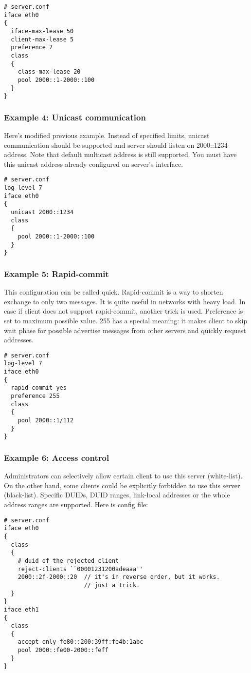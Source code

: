 \begin{lstlisting}
# server.conf
iface eth0
{
  iface-max-lease 50
  client-max-lease 5
  preference 7
  class
  {
    class-max-lease 20
    pool 2000::1-2000::100
  }
}  
\end{lstlisting}

\subsubsection{Example 4: Unicast communication}
Here's modified previous example. Instead of specified limits, unicast
communication should be supported and server should listen on
2000::1234 address. Note that default multicast address is still
supported. You must have this unicast address already configured on 
server's interface.

\begin{lstlisting}
# server.conf
log-level 7
iface eth0
{
  unicast 2000::1234
  class
  {
    pool 2000::1-2000::100
  }
}  
\end{lstlisting}

\subsubsection{Example 5: Rapid-commit}
This configuration can be called quick. Rapid-commit is a way to shorten exchange to only two messages. It is
quite useful in networks with heavy load. In case if client does not
support rapid-commit, another trick is used. Preference is set to
maximum possible value. 255 has a special meaning: it makes client to
skip wait phase for possible advertise messages from other servers and
quickly request addresses.

\begin{lstlisting}
# server.conf
log-level 7
iface eth0
{
  rapid-commit yes
  preference 255
  class
  {
    pool 2000::1/112
  }
}  
\end{lstlisting}

\subsubsection{Example 6: Access control}
Administrators can selectively allow certain client to use this
server (white-list). On the other hand, some clients could be
explicitly forbidden to use this server (black-list). Specific DUIDs,
DUID ranges, link-local addresses or the whole address ranges are
supported. Here is config file:

\begin{lstlisting}
# server.conf
iface eth0
{
  class
  {
    # duid of the rejected client
    reject-clients ``00001231200adeaaa''
    2000::2f-2000::20  // it's in reverse order, but it works.
                       // just a trick. 
  }
}
iface eth1
{
  class
  {
    accept-only fe80::200:39ff:fe4b:1abc
    pool 2000::fe00-2000::feff
  }
}
\end{lstlisting}

